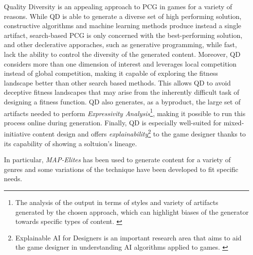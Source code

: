 \documentclass{Configuration_Files/PoliMi3i_thesis}
\begin{document}
Quality Diversity is an appealing approach to PCG in games for a variety of reasons. 
While QD is able to generate a diverse set of high performing solution, constructive algorithms and machine learning methods produce instead a single artifact, search-based PCG is only concerned with the best-performing solution, and other declerative apporaches, such as generative programming, while fast, lack the ability to control the diversity of the generated content. Moreover, QD considers more than one dimension of interest and leverages local competition instead of global competition, making it capable of exploring the fitness landscape better than other search based methods. This allows QD to avoid deceptive fitness landscapes that may arise from the inherently difficult task of designing a fitness function. QD also generates, as a byproduct, the large set of artifacts needed to perform \textit{Expressivity Analysis}\footnote{The analysis of the output in terms of styles and variety of artifacts generated by the chosen approach, which can highlight biases of the generator towards specific types of content. \cite{gravina_procedural_2019}}, making it possible to run this process online during generation. Finally, QD is especially well-suited for mixed-initiative content design and offers \textit{explainability}\footnote{Explainable AI for Designers is an important research area that aims to aid the game designer in understanding AI algorithms applied to games. \cite{gravina_procedural_2019}} to the game designer thanks to its capability of showing a soltuion's lineage. \cite{gravina_procedural_2019} 


In particular, \textit{MAP-Elites} has been used to generate content for a variety of genres and some variations of the technique have been developed to fit specific needs. 
\end{document}
